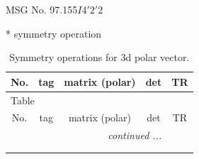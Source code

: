 \documentclass[fleqn,8pt]{jsarticle}
\begin{document}
\setcounter{MaxMatrixCols}{32}

\renewcommand{\tablename}{Table~}
\renewcommand{\figurename}{Figure~}
\begin{center}
\LARGE
MSG No. 97.155\quad$I4'2'2$
\end{center}
* symmetry operation
\renewcommand{\arraystretch}{1.3}
\begin{longtable}{ccccc}
\caption{Symmetry operations for 3d polar vector.}
 \\
 \hline \hline
No. & tag & matrix (polar) & det & TR \\ \hline \endfirsthead

\multicolumn{4}{l}{\tablename\ \thetable{}} \\
 \hline \hline
No. & tag & matrix (polar) & det & TR \\ \hline \endhead

 \hline \hline
\multicolumn{4}{r}{\footnotesize\it continued ...} \\ \endfoot

 \hline \hline
\multicolumn{4}{r}{} \\ \endlastfoot


\end{longtable}
\end{document}
